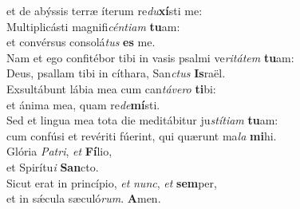 \evenverse et de abýssis terræ íterum re\textit{du}\textbf{xí}sti me:\\
\oddverse Multiplicásti magnifi\textit{cén}\textit{ti}\textit{am} \textbf{tu}am:~\*\\
\oddverse et convérsus consolá\textit{tus} \textbf{es} me.\\
\evenverse Nam et ego confitébor tibi in vasis psalmi ve\textit{ri}\textit{tá}\textit{tem} \textbf{tu}am:~\*\\
\evenverse Deus, psallam tibi in cíthara, San\textit{ctus} \textbf{Is}raël.\\
\oddverse Exsultábunt lábia mea cum can\textit{tá}\textit{ve}\textit{ro} \textbf{ti}bi:~\*\\
\oddverse et ánima mea, quam re\textit{de}\textbf{mí}sti.\\
\evenverse Sed et lingua mea tota die meditábitur ju\textit{stí}\textit{ti}\textit{am} \textbf{tu}am:~\*\\
\evenverse cum confúsi et revériti fúerint, qui quærunt ma\textit{la} \textbf{mi}hi.\\
\oddverse Glória \textit{Pa}\textit{tri}, \textit{et} \textbf{Fí}lio,~\*\\
\oddverse et Spirítu\textit{i} \textbf{San}cto.\\
\evenverse Sicut erat in princípio, \textit{et} \textit{nunc}, \textit{et} \textbf{sem}per,~\*\\
\evenverse et in sǽcula sæculó\textit{rum}. \textbf{A}men.\\
